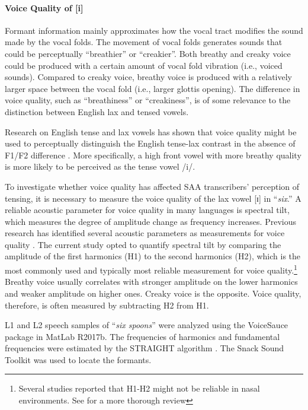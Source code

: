 \paragraph{Voice Quality of [i]}

Formant information mainly approximates how the vocal tract modifies the sound made by the vocal folds.  The movement of vocal folds generates sounds that could be perceptually “breathier” or “creakier”. Both breathy and creaky voice could be produced with a certain amount of vocal fold vibration (i.e., voiced sounds). Compared to creaky voice, breathy voice is produced with a relatively larger space between the vocal fold (i.e., larger glottis opening). The difference in voice quality, such as “breathiness” or “creakiness”, is of some relevance to the distinction between English lax and tensed vowels. 

Research on English tense and lax vowels has shown that voice quality might be used to perceptually distinguish the English tense-lax contrast in the absence of F1/F2 difference \citep{Di_Paolo_1990, Lotto_1997}. More specifically, a high front vowel with more breathy quality is more likely to be perceived as the tense vowel /i/. 

To investigate whether voice quality has affected SAA transcribers’ perception of tensing, it is necessary to measure the voice quality of the lax vowel [ɪ] in “\textit{six}.” A reliable acoustic parameter for voice quality in many languages is spectral tilt, which measures the degree of amplitude change as frequency increases. Previous research has identified several acoustic parameters as measurements for voice quality \citep{Garellek_2019}. The current study opted to quantify spectral tilt by comparing the amplitude of the first harmonics (H1) to the second harmonics (H2), which is the most commonly used and typically most reliable measurement for voice quality.\footnote{Several studies reported that H1-H2 might not be reliable in nasal environments. See \citet{Garellek_2019} for a more thorough review} Breathy voice usually correlates with stronger amplitude on the lower harmonics and weaker amplitude on higher ones. Creaky voice is the opposite. Voice quality, therefore, is often measured by subtracting H2 from H1.

L1 and L2 speech samples of “\textit{six spoons}” were analyzed using the VoiceSauce package \citep{Shue_2011} in MatLab R2017b. The frequencies of harmonics and fundamental frequencies were estimated by the STRAIGHT algorithm \citep{Kawahara_2009}. The Snack Sound Toolkit \citep{Sjolander_2004} was used to locate the formants. 

